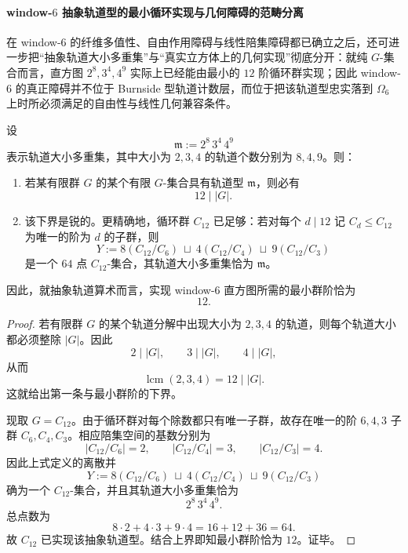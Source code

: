 \paragraph{window-\texorpdfstring{$6$}{6} 抽象轨道型的最小循环实现与几何障碍的范畴分离}
在 window-\(6\) 的纤维多值性、自由作用障碍与线性陪集障碍都已确立之后，还可进一步把“抽象轨道大小多重集”与“真实立方体上的几何实现”彻底分开：就纯 \(G\)-集合而言，直方图 \(2^8,3^4,4^9\) 实际上已经能由最小的 \(12\) 阶循环群实现；因此 window-\(6\) 的真正障碍并不位于 Burnside 型轨道计数层，而位于把该轨道型忠实落到 \(\Omega_6\) 上时所必须满足的自由性与线性几何兼容条件。

\begin{theorem}\label{thm:xi-time-part70da-window6-abstract-orbittype-minimal-c12}
设
\[
\mathfrak m:=2^8\,3^4\,4^9
\]
表示轨道大小多重集，其中大小为 \(2,3,4\) 的轨道个数分别为 \(8,4,9\)。则：
\begin{enumerate}
  \item 若某有限群 \(G\) 的某个有限 \(G\)-集合具有轨道型 \(\mathfrak m\)，则必有
  \[
  12\mid |G|.
  \]
  \item 该下界是锐的。更精确地，循环群 \(C_{12}\) 已足够：若对每个 \(d\mid 12\) 记 \(C_d\le C_{12}\) 为唯一的阶为 \(d\) 的子群，则
  \[
  Y:=8(C_{12}/C_6)\ \sqcup\ 4(C_{12}/C_4)\ \sqcup\ 9(C_{12}/C_3)
  \]
  是一个 \(64\) 点 \(C_{12}\)-集合，其轨道大小多重集恰为 \(\mathfrak m\)。
\end{enumerate}
因此，就抽象轨道算术而言，实现 window-\(6\) 直方图所需的最小群阶恰为
\[
12.
\]
\end{theorem}
\begin{proof}
若有限群 \(G\) 的某个轨道分解中出现大小为 \(2,3,4\) 的轨道，则每个轨道大小都必须整除 \(|G|\)。因此
\[
2\mid |G|,
\qquad
3\mid |G|,
\qquad
4\mid |G|,
\]
从而
\[
\operatorname{lcm}(2,3,4)=12\mid |G|.
\]
这就给出第一条与最小群阶的下界。

现取 \(G=C_{12}\)。由于循环群对每个除数都只有唯一子群，故存在唯一的阶 \(6,4,3\) 子群 \(C_6,C_4,C_3\)。相应陪集空间的基数分别为
\[
|C_{12}/C_6|=2,
\qquad
|C_{12}/C_4|=3,
\qquad
|C_{12}/C_3|=4.
\]
因此上式定义的离散并
\[
Y:=8(C_{12}/C_6)\ \sqcup\ 4(C_{12}/C_4)\ \sqcup\ 9(C_{12}/C_3)
\]
确为一个 \(C_{12}\)-集合，并且其轨道大小多重集恰为
\[
2^8\,3^4\,4^9.
\]
总点数为
\[
8\cdot 2+4\cdot 3+9\cdot 4=16+12+36=64.
\]
故 \(C_{12}\) 已实现该抽象轨道型。结合上界即知最小群阶恰为 \(12\)。证毕。
\end{proof}

